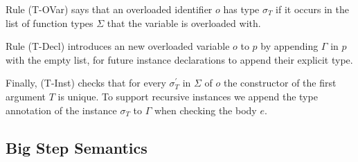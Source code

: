 \documentclass[runningheads]{llncs}
\begin{document}
Rule (T-OVar) says that an overloaded identifier $o$ has type $\sigma_T$ if it occurs in the list of function types $\Sigma$ that the variable is overloaded with. 

Rule (T-Decl) introduces an new overloaded variable $o$ to $p$ by appending $\Gamma$ in $p$ with the empty list, for future instance declarations to append their explicit type.

Finally, (T-Inst) checks that for every $\sigma_T^\prime$ in $\Sigma$ of $o$ the constructor of the first argument $T$ is unique. 
To support recursive instances we append the type annotation of the instance $\sigma_T$ to $\Gamma$ when checking the body $e$. 
\subsection{Big Step Semantics}
\label{semantics}
\end{document}

